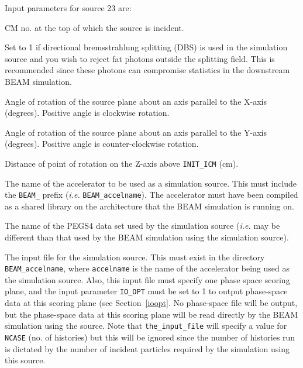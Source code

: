 \documentclass[12pt,twoside]{article}
\begin{document}
Input parameters for source 23 are:
\begin{description}
\item [INIT\_ICM] CM no. at the top of which the source is incident.
\item [ISRC\_DBS] Set to 1 if directional bremsstrahlung splitting (DBS) is used
in the simulation source and you wish to reject fat photons outside the splitting
field.  This is recommended since these photons can compromise statistics in the
downstream BEAM simulation.
\item [ALPHA24] Angle of rotation of the source plane about an axis parallel to the X-axis (degrees).
Positive angle is clockwise rotation.
\item [BETA24] Angle of rotation of the source plane about an axis parallel to the Y-axis
(degrees).  Positive angle is counter-clockwise rotation.
\item [DIST24] Distance of point of rotation on the Z-axis above {\tt INIT\_ICM} (cm).
\item [the\_beam\_code] The name of the accelerator to be used as a simulation source.
This must include the {\tt BEAM\_} prefix ({\em i.e.} {\tt BEAM\_accelname}).  The accelerator
must have been compiled as a shared library on the architecture that the BEAM simulation
is running on.
\item [the\_pegs\_file] The name of the PEGS4 data set used by
the simulation source ({\em i.e.} may be different than that used by the BEAM simulation
using the simulation source).
\item [the\_input\_file] The input file for the simulation source.  This must exist in
the directory {\tt BEAM\_accelname}, where {\tt accelname} is the name of the
accelerator being used as the simulation source.  Also, this input file must specify
one phase space scoring plane, and the input parameter {\tt IO\_OPT} must be set
to 1 to output phase-space data at this scoring plane (see Section~\ref{ioopt}.  No phase-space file will be output,
but the phase-space data at this scoring plane will be read directly by the BEAM simulation
using the source.
Note that {\tt the\_input\_file} will specify a value for
{\tt NCASE} (no. of histories) but this will be ignored since the number of histories run
is dictated by the number of incident particles required by the simulation using this
source.
\end{description}
\end{document}
